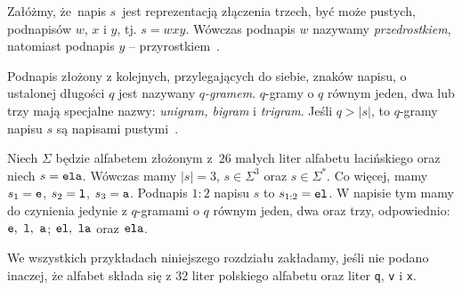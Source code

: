 \documentclass{praca1}
\begin{document}
\begin{definition}
Załóżmy, że~napis $s$~jest reprezentacją złączenia trzech, być może pustych, podnapisów $w$, $x$ i $y$, tj. $s = wxy$. Wówczas podnapis $w$ nazywamy \emph{przedrostkiem}, natomiast podnapis $y$ -- przyrostkiem~\cite{Boytsov2011:indexingmethods}.
\end{definition}

\begin{definition}
Podnapis złożony z kolejnych, przylegających do siebie, znaków napisu, o ustalonej długości $q$ jest nazywany \emph{$q$-gramem}. $q$-gramy o $q$ równym jeden, dwa lub trzy mają specjalne nazwy: \emph{unigram, bigram} i \emph{trigram}. Jeśli $q > |s|$, to $q$-gramy napisu $s$ są napisami pustymi~\cite{Boytsov2011:indexingmethods}.
\end{definition}



\begin{example}
Niech $\Sigma$ będzie alfabetem złożonym z~$26$ małych liter alfabetu łacińskiego oraz niech $s = \verb|ela|$. Wówczas mamy $|s| = 3$, $s \in \Sigma^3$ oraz $s \in \Sigma^*$. Co więcej, mamy $s_1 = \verb|e|$, $s_2 = \verb|l|$, $s_3 = \verb|a|$. Podnapis $1\!\!:\!\!2$ napisu $s$ to $s_{1:2} = \verb|el|$. W napisie tym mamy do czynienia jedynie z $q$-gramami o $q$ równym jeden, dwa oraz trzy, odpowiednio: $\verb|e|,\ \verb|l|,\ \verb|a|$; $\verb|el|,\ \verb|la|$ oraz $\verb|ela|$.
\end{example}


We wszystkich przykładach niniejszego rozdziału zakładamy, jeśli nie podano inaczej, że alfabet składa się z $32$ liter polskiego alfabetu oraz liter \verb|q|, \verb|v| i \verb|x|.
\end{document}
